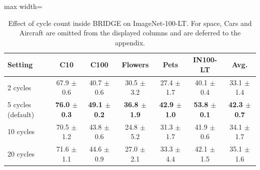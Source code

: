\begin{table}[t]
\centering
\scriptsize
\setlength{\tabcolsep}{3.5pt}
\caption{Effect of cycle count inside BRIDGE on ImageNet-100-LT. For space, Cars and Aircraft are omitted from the displayed columns and are deferred to the appendix.}
\label{tab:main_ablation_cycles}
\begin{adjustbox}{max width=\textwidth}
\begin{tabular}{l c c c c c c}
\toprule
Setting & C10 & C100 & Flowers & Pets & IN100-LT & Avg. \\
\midrule
2 cycles & 67.9 {\scriptsize$\pm$ 0.6} & 40.7 {\scriptsize$\pm$ 0.6} & 30.5 {\scriptsize$\pm$ 3.2} & 27.4 {\scriptsize$\pm$ 1.7} & 40.1 {\scriptsize$\pm$ 0.4} & 33.1 {\scriptsize$\pm$ 1.4} \\
5 cycles (default) & \textbf{76.0 {\scriptsize$\pm$ 0.3}} & \textbf{49.1 {\scriptsize$\pm$ 0.2}} & \textbf{36.8 {\scriptsize$\pm$ 1.9}} & \textbf{42.9 {\scriptsize$\pm$ 1.0}} & \textbf{53.8 {\scriptsize$\pm$ 0.1}} & \textbf{42.3 {\scriptsize$\pm$ 0.7}} \\
10 cycles & 70.5 {\scriptsize$\pm$ 1.2} & 43.8 {\scriptsize$\pm$ 0.6} & 24.8 {\scriptsize$\pm$ 5.2} & 31.3 {\scriptsize$\pm$ 1.7} & 41.9 {\scriptsize$\pm$ 0.6} & 34.1 {\scriptsize$\pm$ 1.7} \\
20 cycles & 71.6 {\scriptsize$\pm$ 1.1} & 44.6 {\scriptsize$\pm$ 0.9} & 27.0 {\scriptsize$\pm$ 2.1} & 33.3 {\scriptsize$\pm$ 4.4} & 42.1 {\scriptsize$\pm$ 1.5} & 35.1 {\scriptsize$\pm$ 1.6} \\
\bottomrule
\end{tabular}
\end{adjustbox}
\end{table}
